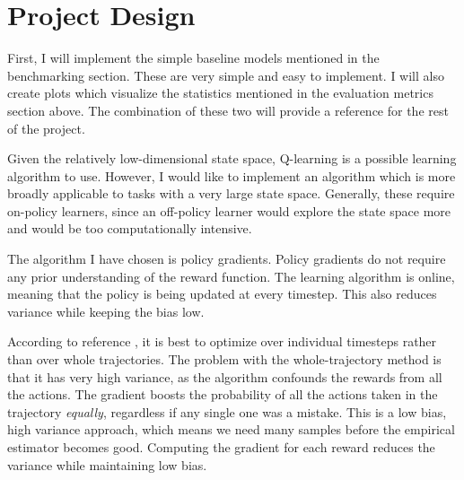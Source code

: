\documentclass[12pt,a4paper]{article}
\begin{document}
\section*{Project Design}
%
First, I will implement the simple baseline models mentioned in the benchmarking section. These are very simple and easy to implement. I will also create plots which visualize the statistics mentioned in the evaluation metrics section above. The combination of these two will provide a reference for the rest of the project.

Given the relatively low-dimensional state space, Q-learning is a possible learning algorithm to use. However, I would like to implement an algorithm which is more broadly applicable to tasks with a very large state space. Generally, these require on-policy learners, since an off-policy learner would explore the state space more and would be too computationally intensive.

The algorithm I have chosen is policy gradients. Policy gradients do not require any prior understanding of the reward function.\cite{pg_lecture} The learning algorithm is online, meaning that the policy is being updated at every timestep. This also reduces variance while keeping the bias low.\cite{pg_lecture}\cite{ddpg_blog}

According to reference \cite{pg_lecture}, it is best to optimize over individual timesteps rather than over whole trajectories. The problem with the whole-trajectory method is that it has very high variance, as the algorithm confounds the rewards from all the actions. The gradient boosts the probability of all the actions taken in the trajectory \textit{equally}, regardless if any single one was a mistake. This is a low bias, high variance approach, which means we need many samples before the empirical estimator becomes good. Computing the gradient for each reward reduces the variance while maintaining low bias.
\end{document}

